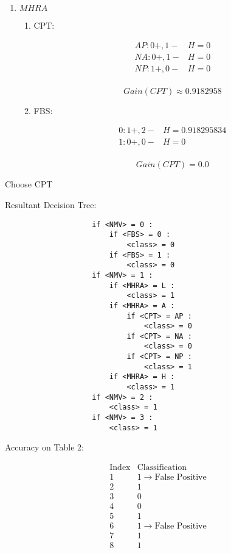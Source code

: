 \begin{enumerate}
\begin{enumerate}
\begin{enumerate}
						\item{\(MHRA\)}
						
							\begin{enumerate}
							
								\item{CPT:}
								
									\[
										\begin{array}{l|l}
											AP: 0+, 1- & H = 0 \\
											NA: 0+, 1- & H = 0 \\
											NP: 1+, 0- & H = 0 \\
										\end{array}
									\]
									
									\[
										Gain(CPT) \approx 0.9182958
									\]
								
								\item{FBS:}
							
									\[
										\begin{array}{l|l}
											0: 1+, 2- & H = 0.918295834 \\
											1: 0+, 0- & H = 0 \\
										\end{array}
									\]
									
									\[
										Gain(CPT) = 0.0
									\]

							\end{enumerate}
						
					\end{enumerate}
					
				Choose CPT
				
				Resultant Decision Tree:
				
				\begin{lstlisting}
					if <NMV> = 0 :
						if <FBS> = 0 :
							<class> = 0
						if <FBS> = 1 :
							<class> = 0
					if <NMV> = 1 :
						if <MHRA> = L :
							<class> = 1
						if <MHRA> = A :
							if <CPT> = AP :
								<class> = 0
							if <CPT> = NA :
								<class> = 0
							if <CPT> = NP :
								<class> = 1
						if <MHRA> = H :
							<class> = 1
					if <NMV> = 2 :
						<class> = 1
					if <NMV> = 3 :
						<class> = 1
				\end{lstlisting}
		
		\end{enumerate}
		
		Accuracy on Table 2:
		
		\[
			\begin{array}{c|l}
				\text{Index} & \text{Classification} \\
				\hline
				1 & 1 \rightarrow \text{False Positive} \\
				2 & 1 \\
				3 & 0 \\
				4 & 0 \\  
				5 & 1 \\
				6 & 1 \rightarrow \text{False Positive} \\
				7 & 1 \\
				8 & 1 \\
			\end{array}
		\]
		

\end{enumerate}
